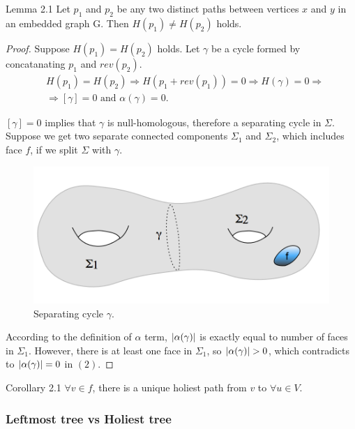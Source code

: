 \documentclass{article}
\begin{document}
\begin{oneshot}{Lemma 2.1}
Let $p_1$ and $p_2$ be any two distinct paths between vertices $x$ and $y$ in an embedded graph G. Then $H(p_1) \neq H(p_2)$ holds. 
\end{oneshot}
\begin{proof}
Suppose $H(p_1) = H(p_2)$ holds. Let $\gamma$ be a cycle formed by concatanating $p_1$ and $rev(p_2)$.
\begin{align}
& H(p_1) = H(p_2) \Rightarrow H(p_1 + rev(p_1)) = 0 \Rightarrow  H(\gamma) = 0 \Rightarrow \\
&  \Rightarrow [\gamma] = 0 \text{ and } \alpha(\gamma) = 0.
\end{align}

$[\gamma] = 0$ implies that $\gamma$ is null-homologous, therefore a separating cycle in $\Sigma$. Suppose we get two separate connected components $\Sigma_1$ and $\Sigma_2$, which includes face $f$, if we split $\Sigma$ with $\gamma$. \\

\begin{figure}[H]
  \label{fig: g2_separating_cycle}
  \centering
  \includegraphics[scale = 0.55]{figures/g2_separating_cycle.png}
  \caption{Separating cycle $\gamma$.}
\end{figure}

According to the definition of $\alpha$ term, $\mathopen| \alpha(\gamma) \mathclose|$ is exactly equal to number of faces in $\Sigma_1$. However, there is at least one face in $\Sigma_1$, so $\mathopen| \alpha(\gamma) \mathclose| > 0$, which contradicts to $\mathopen| \alpha(\gamma) \mathclose| = 0$ in $(2)$.
\end{proof}

\begin{oneshot}{Corollary 2.1}
$\forall v \in f$, there is a unique holiest path from $v$ to $\forall u \in V$.
\end{oneshot}

\subsubsection{Leftmost tree vs Holiest tree}
\end{document}
